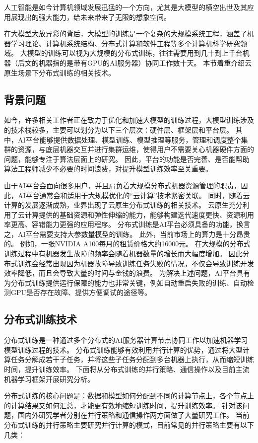 人工智能是如今计算机领域发展迅猛的一个方向，尤其是大模型的横空出世及其应用展现出的强大能力，给未来带来了无限的想象空间。

在大模型大放异彩的背后，大模型的训练是一个复杂的大规模系统工程，涵盖了机器学习理论、计算机系统结构、分布式计算和软件工程等多个计算机科学研究领域。
大模型的训练可以视为大规模的分布式训练，往往需要用到几十到上千台机器（后文的机器指的是带有GPU的AI服务器）协同工作数十天。
本节着重介绍云原生场景下分布式训练的相关技术。

\subsection{背景问题}
如今，许多相关工作者正在致力于优化和加速大模型的训练过程，大模型训练涉及的技术栈较多，主要可以划分为以下三个层次：硬件层、框架层和平台层。
其中，AI平台能够提供数据处理、模型训练、模型推理等服务，管理和调度整个集群的资源，与底层机器交互并进行集群运维，使得用户不需要关心机器硬件方面的问题，能够专注于算法层面上的研究。
因此，平台的功能是否完善、是否能帮助算法工程师减少不必要的时间浪费，对提升模型训练效率至关重要。

由于AI平台会面向很多用户，并且肩负着大规模分布式机器资源管理的职责，因此，AI平台通常会和适用于大规模优化的“云计算”技术紧密关联。
同时，随着云计算的发展逐渐成熟，业界出现了云原生分布式训练的相关技术。
云原生充分利用了云计算提供的基础资源和弹性伸缩的能力，能够构建迭代速度更快、资源利用率更高、容错能力更强的应用程序。
分布式训练是AI平台必须具备的功能，换言之，AI平台需要支持大参数量模型的训练。
此外，当前市场上的算力是十分昂贵的。
例如，一张NVIDIA A100每月的租赁价格大约16000元。
在大规模的分布式训练过程中有机器发生故障的频率会随着机器数量的增长而大幅度增加。
因此分布式训练会经常出现因为机器故障导致训练任务失败的情况，不仅会导致训练开发效率降低，而且会导致大量的时间与金钱的浪费。
为解决上述问题，AI平台具有为分布式训练提供运行保障的能力也非常关键，例如自动重启失败的训练、自动检测GPU是否存在故障、提供方便调试的途径等。

\subsection{分布式训练技术}
分布式训练是一种通过多个分布式的AI服务器计算节点协同工作以加速机器学习模型训练过程的技术。
分布式训练能够有效利用并行计算的优势，通过将大型计算任务分解成若干子任务，并将这些子任务分配到多台机器上执行，从而缩短训练时间，提升训练效率。
下面将从分布式训练的并行策略、通信操作以及目前主流机器学习框架开展研究分析。

分布式训练的核心问题是：数据和模型如何分配到不同的计算节点上，各个节点上的计算结果又如何汇总，才能更有效地缩短训练时间，提升训练效率。
针对该问题，国内外研究学者分别在并行策略和通信操作两方面做了大量研究工作。
当前分布式训练的并行策略主要研究并行计算的模式，目前常见的并行策略主要有以下几类：

